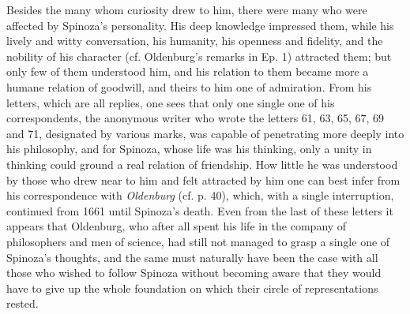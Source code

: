 \documentclass[12pt,a4paper,openany]{book}
\newcommand{\opage}[1]{\marginnote{\footnotesize\textit{[#1]}}}
\begin{document}
Besides the many whom curiosity drew to him, there were many who were
affected by Spinoza's personality. His deep knowledge impressed them,
while his lively and witty conversation, his humanity, his openness and
fidelity, and the nobility of his character (cf. Oldenburg's remarks in
Ep. 1) attracted them; but only few of them understood him, and his
relation to them became more a humane relation of goodwill, and theirs
to him one of admiration. From his letters, which are all replies, one
sees that only one single one of his correspondents, the anonymous writer
who wrote the letters 61, 63, 65, 67, 69 and 71, designated by various
marks, was capable of penetrating more deeply into his philosophy, and
for Spinoza, whose life was his thinking, only a unity in thinking could
ground a real relation of friendship. How little he was understood by
those who drew near to him and felt attracted by him one can best infer
from his correspondence with \emph{Oldenburg} (cf. p. 40), which, with a
single interruption, continued from 1661 until Spinoza's death. Even from
the
\opage{32}\setcounter{footnote}{0}last of these letters it appears that
Oldenburg, who after all spent his life in the company of philosophers
and men of science, had still not managed to grasp a single one of
Spinoza's thoughts, and the same must naturally have been the case with
all those who wished to follow Spinoza without becoming aware that they
would have to give up the whole foundation on which their circle of
representations rested.
\end{document}
